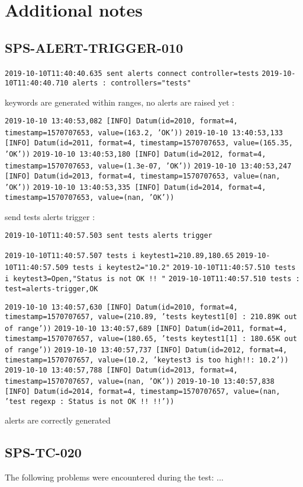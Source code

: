 \section{Additional notes}

\subsection{SPS-ALERT-TRIGGER-010}
\label{sec:tc-010}


\texttt{2019-10-10T11:40:40.635 sent alerts connect controller=tests}
\texttt{2019-10-10T11:40:40.710 alerts : controllers="tests" }

keywords are generated within ranges, no alerts are raised yet :

\texttt{2019-10-10 13:40:53,082 [INFO] Datum(id=2010, format=4, timestamp=1570707653, value=(163.2, 'OK'))}
\texttt{2019-10-10 13:40:53,133 [INFO] Datum(id=2011, format=4, timestamp=1570707653, value=(165.35, 'OK'))}
\texttt{2019-10-10 13:40:53,180 [INFO] Datum(id=2012, format=4, timestamp=1570707653, value=(1.3e-07, 'OK'))}
\texttt{2019-10-10 13:40:53,247 [INFO] Datum(id=2013, format=4, timestamp=1570707653, value=(nan, 'OK'))}
\texttt{2019-10-10 13:40:53,335 [INFO] Datum(id=2014, format=4, timestamp=1570707653, value=(nan, 'OK'))}

send tests alerts trigger :

\texttt{2019-10-10T11:40:57.503 sent tests alerts trigger}

\texttt{2019-10-10T11:40:57.507 tests i keytest1=210.89,180.65}
\texttt{2019-10-10T11:40:57.509 tests i keytest2="10.2"}
\texttt{2019-10-10T11:40:57.510 tests i keytest3=Open,"Status is not OK !! "}
\texttt{2019-10-10T11:40:57.510 tests : test=alerts-trigger,OK}

\texttt{2019-10-10 13:40:57,630 [INFO] Datum(id=2010, format=4, timestamp=1570707657, value=(210.89, 'tests keytest1[0] : 210.89K out of range'))}
\texttt{2019-10-10 13:40:57,689 [INFO] Datum(id=2011, format=4, timestamp=1570707657, value=(180.65, 'tests keytest1[1] : 180.65K out of range'))}
\texttt{2019-10-10 13:40:57,737 [INFO] Datum(id=2012, format=4, timestamp=1570707657, value=(10.2, 'keytest3 is too high!!: 10.2'))}
\texttt{2019-10-10 13:40:57,788 [INFO] Datum(id=2013, format=4, timestamp=1570707657, value=(nan, 'OK'))}
\texttt{2019-10-10 13:40:57,838 [INFO] Datum(id=2014, format=4, timestamp=1570707657, value=(nan, 'test regexp : Status is not OK !!  !!'))}

alerts are correctly generated


\subsection{SPS-TC-020}
\label{sec:tc-020}

The following problems were encountered during the test: ...